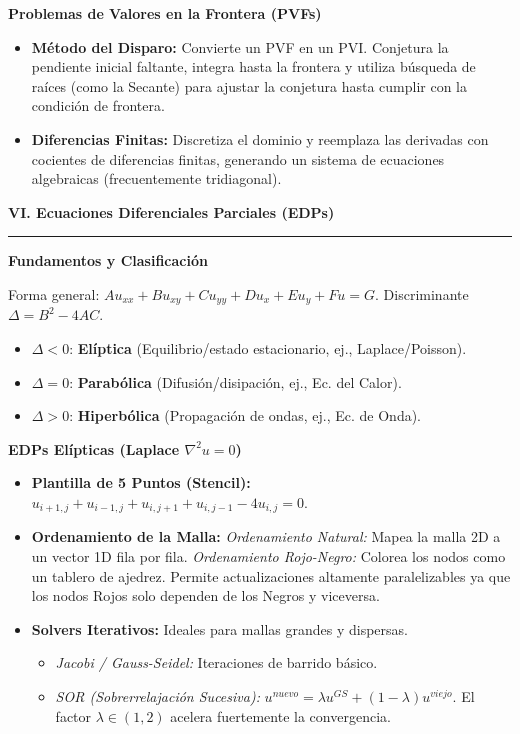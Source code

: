\documentclass[10pt, landscape, twocolumn]{article}
\newcommand{\cheatsheetsection}[1]{
    \vspace{0.6em}
    {\color{themeblue}\large\bfseries #1} \par
    \vspace{-0.5em}
    {\color{themeblue}\rule{\linewidth}{1pt}} \par
    \vspace{0.2em}
}
\newcommand{\cheatsheetsubsection}[1]{
    \vspace{0.4em}
    {\color{themeblue}\normalsize\bfseries #1} \par
    \vspace{0.1em}
}
\begin{document}
\cheatsheetsubsection{Problemas de Valores en la Frontera (PVFs)}
\begin{itemize}[leftmargin=*, nosep]
    \item \textbf{Método del Disparo:} Convierte un PVF en un PVI. Conjetura la pendiente inicial faltante, integra hasta la frontera y utiliza búsqueda de raíces (como la Secante) para ajustar la conjetura hasta cumplir con la condición de frontera.
    \item \textbf{Diferencias Finitas:} Discretiza el dominio y reemplaza las derivadas con cocientes de diferencias finitas, generando un sistema de ecuaciones algebraicas (frecuentemente tridiagonal).
\end{itemize}

\newpage
\cheatsheetsection{VI. Ecuaciones Diferenciales Parciales (EDPs)}

\cheatsheetsubsection{Fundamentos y Clasificación}
Forma general: $Au_{xx} + Bu_{xy} + Cu_{yy} + Du_x + Eu_y + Fu = G$.
Discriminante $\Delta = B^2 - 4AC$.
\begin{itemize}[leftmargin=*, nosep]
    \item $\Delta < 0$: \textbf{Elíptica} (Equilibrio/estado estacionario, ej., Laplace/Poisson).
    \item $\Delta = 0$: \textbf{Parabólica} (Difusión/disipación, ej., Ec. del Calor).
    \item $\Delta > 0$: \textbf{Hiperbólica} (Propagación de ondas, ej., Ec. de Onda).
\end{itemize}

\cheatsheetsubsection{EDPs Elípticas (Laplace $\nabla^2 u = 0$)}
\begin{itemize}[leftmargin=*, nosep]
    \item \textbf{Plantilla de 5 Puntos (Stencil):} $u_{i+1,j} + u_{i-1,j} + u_{i,j+1} + u_{i,j-1} - 4u_{i,j} = 0$.
    \item \textbf{Ordenamiento de la Malla:} 
    \textit{Ordenamiento Natural:} Mapea la malla 2D a un vector 1D fila por fila.
    \textit{Ordenamiento Rojo-Negro:} Colorea los nodos como un tablero de ajedrez. Permite actualizaciones altamente paralelizables ya que los nodos Rojos solo dependen de los Negros y viceversa.
    \item \textbf{Solvers Iterativos:} Ideales para mallas grandes y dispersas.
    \begin{itemize}[leftmargin=*, nosep]
        \item \textit{Jacobi / Gauss-Seidel:} Iteraciones de barrido básico.
        \item \textit{SOR (Sobrerrelajación Sucesiva):} $u^{nuevo} = \lambda u^{GS} + (1-\lambda)u^{viejo}$. El factor $\lambda \in (1,2)$ acelera fuertemente la convergencia.
    \end{itemize}
\end{itemize}
\end{document}
